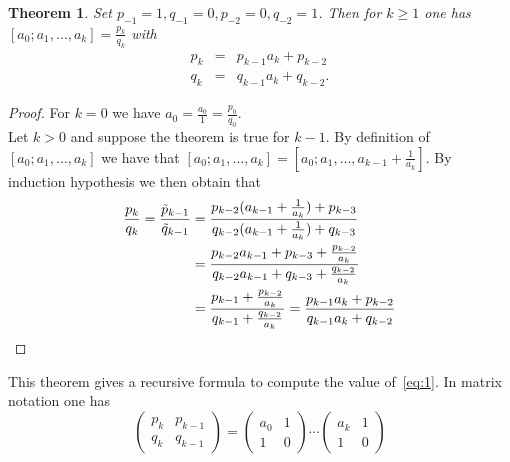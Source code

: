 \documentclass[a4paper,11pt,american]{article}
\theoremstyle{plain}
\newtheorem{theorem}{Theorem}
\theoremstyle{definition}
\begin{document}
\begin{theorem}
  \label{thr:2}
  Set $p_{-1} = 1, q_{-1} = 0, p_{-2} = 0, q_{-2} =1$. Then for $k\geq1$ one has $[a_0;a_1,\dots,a_k]=\frac{p_k}{q_k}$ with
  \begin{equation}
    \label{eq:2}
    \begin{array}{rcl}
    p_ k & = & p_{k-1} a_k + p_{k-2}\\
      q_ k & = & q_{k-1} a_k + q_{k-2}.
    \end{array}
  \end{equation}
  
\end{theorem}
  \begin{proof}
      For $k=0$ we have $a_0=\frac{a_0}{1}=\frac{p_0}{q_0}$.\\
      Let $k>0$ and suppose the theorem is true for $k-1$. By definition of $[a_0;a_1,\dots,a_k]$ we have that $[a_0;a_1,\dots,a_k]=[a_0;a_1,\dots,a_{k-1}+\frac{1}{a_k}]$. By induction hypothesis we then obtain that \begin{align*}
          \frac{p_k}{q_k}=\frac{\Tilde{p}_{k-1}}{\Tilde{q}_{k-1}}&=\frac{p_{k-2}(a_{k-1}+\frac{1}{a_k}) + p_{k-3}}{q_{k-2} (a_{k-1}+\frac{1}{a_k}) + q_{k-3}}\\
          &=\frac{p_{k-2} a_{k-1} + p_{k-3}+\frac{p_{k-2}}{a_k}}{q_{k-2} a_{k-1} + q_{k-3}+\frac{q_{k-2}}{a_k}}\\
          &=\frac{p_{k-1}+\frac{p_{k-2}}{a_k}}{q_{k-1}+\frac{q_{k-2}}{a_k}}=\frac{p_{k-1} a_k + p_{k-2}}{q_{k-1} a_k + q_{k-2}}
      \end{align*}
  \end{proof}
This theorem gives a recursive formula to compute the value of~\eqref{eq:1}. In matrix notation one has
\begin{equation}
  \label{eq:3}
  \begin{pmatrix}
    p_k & p_{k-1} \\
    q_k & q_{k-1}
  \end{pmatrix} =
  \begin{pmatrix}
    a_0 & 1\\
    1 & 0
  \end{pmatrix} \cdots
  \begin{pmatrix}
    a_k & 1 \\
    1 & 0
  \end{pmatrix}
\end{equation}
\end{document}
